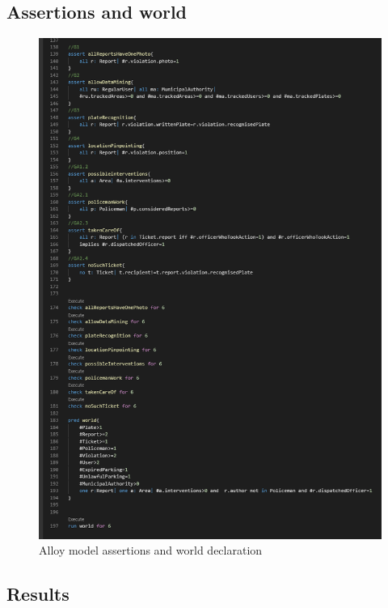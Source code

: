 \subsection{Assertions and world}
\begin{figure}[h!]
	\includegraphics[scale=0.70]{Images/Assertions_and_world_1-2}
	\caption{Alloy model assertions and world declaration}
\end{figure}
\newpage
\subsection{Results}
